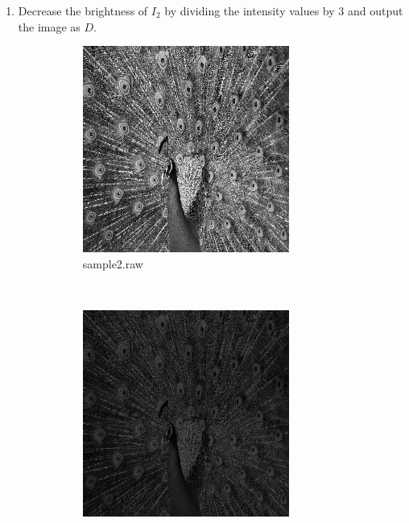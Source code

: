 \documentclass{article}
\begin{document}
\begin{enumerate}[label=(\alph*)]
    \item Decrease the brightness of $I_2$ by dividing the intensity values by $3$ and output the image as $D$.

    \begin{figure}[!htb]
        \centering
        \begin{subfigure}[b]{0.3\textwidth}
            \includegraphics[width=\textwidth]{img/sample2.png}
            \caption{sample2.raw}
        \end{subfigure}
        ~
        \begin{subfigure}[b]{0.3\textwidth}
            \includegraphics[width=\textwidth]{img/D.png}

\end{subfigure}
\end{figure}
\end{enumerate}
\end{document}
